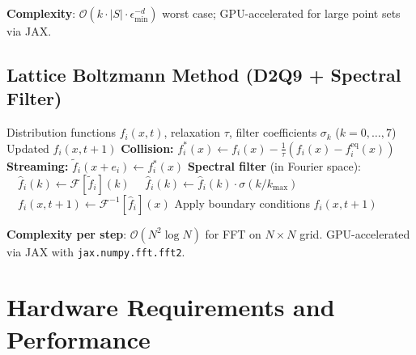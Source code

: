 \textbf{Complexity}: $\mathcal{O}(k \cdot |S| \cdot \epsilon_{\min}^{-d})$
worst case; GPU-accelerated for large point sets via JAX.

\subsection{Lattice Boltzmann Method (D2Q9 + Spectral Filter)}

\begin{algorithm}[H]
\caption{LBM Time Step with Order-7 Spectral Filter}
\label{alg:lbm}
\begin{algorithmic}[1]
\Require Distribution functions $f_i(x,t)$, relaxation $\tau$,
    filter coefficients $\sigma_k$ ($k=0,\ldots,7$)
\Ensure Updated $f_i(x, t+1)$
\State \textbf{Collision:}
    $f_i^*(x) \gets f_i(x) - \frac{1}{\tau}(f_i(x) - f_i^{\mathrm{eq}}(x))$
\State \textbf{Streaming:}
    $\tilde{f}_i(x + e_i) \gets f_i^*(x)$
\State \textbf{Spectral filter} (in Fourier space):
\State $\quad \hat{f}_i(k) \gets \mathcal{F}[\tilde{f}_i](k)$
\State $\quad \hat{f}_i(k) \gets \hat{f}_i(k) \cdot \sigma(k/k_{\max})$
\State $\quad f_i(x, t+1) \gets \mathcal{F}^{-1}[\hat{f}_i](x)$
\State Apply boundary conditions
\State \Return $f_i(x, t+1)$
\end{algorithmic}
\end{algorithm}

\textbf{Complexity per step}: $\mathcal{O}(N^2 \log N)$ for FFT on
$N \times N$ grid.  GPU-accelerated via JAX with
\texttt{jax.numpy.fft.fft2}.

\section{Hardware Requirements and Performance}
\label{app:hardware}

